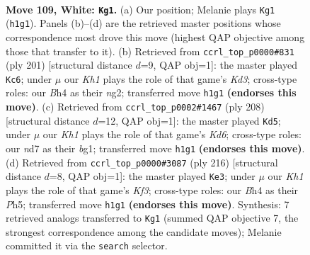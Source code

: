 \documentclass[11pt]{article}
\begin{document}
\clearpage

\begin{figure}[p]\centering
\begin{subfigure}{0.46\textwidth}\centering
\resizebox{\linewidth}{!}{%
\newchessgame
\chessboard[
  setfen={7k/3n4/8/5P2/p6B/P6P/8/7K w - - 37 109},
  showmover=false,
  pgfstyle=straightmove, color=movearrow, markmove={h1-g1}
]}
\caption{}
\end{subfigure}\hfill
\begin{subfigure}{0.46\textwidth}\centering
\resizebox{\linewidth}{!}{%
\newchessgame
\chessboard[
  setfen={8/8/3k4/p7/P2K4/8/4p1N1/8 b - - 69 101},
  showmover=false,
  pgfstyle=straightmove, color=movearrow, markmove={d6-c6}
]}
\caption{}
\end{subfigure}
\\[4pt]
\begin{subfigure}{0.46\textwidth}\centering
\resizebox{\linewidth}{!}{%
\newchessgame
\chessboard[
  setfen={3B4/8/3K2k1/5p2/8/5P1P/8/6b1 w - - 24 105},
  showmover=false,
  pgfstyle=straightmove, color=movearrow, markmove={d6-d5}
]}
\caption{}
\end{subfigure}\hfill
\begin{subfigure}{0.46\textwidth}\centering
\resizebox{\linewidth}{!}{%
\newchessgame
\chessboard[
  setfen={8/6k1/3p4/p6P/2P4P/5K2/8/8 w - - 0 109},
  showmover=false,
  pgfstyle=straightmove, color=movearrow, markmove={f3-e3}
]}
\caption{}
\end{subfigure}
\caption{\textbf{Move 109, White: \texttt{Kg1}.} (a) Our position; Melanie plays \texttt{Kg1} (\texttt{h1g1}). Panels (b)--(d) are the retrieved master positions whose correspondence most drove this move (highest QAP objective among those that transfer to it). (b) Retrieved from \texttt{ccrl\_top\_p0000\#831} (ply 201) [structural distance $d$=9, QAP obj=1]: the master played \texttt{Kc6}; under $\mu$ our \emph{Kh1} plays the role of that game's \emph{Kd3}; cross-type roles: our \emph{B}h4 as their \emph{n}g2; transferred move \texttt{h1g1} \textbf{(endorses this move)}. (c) Retrieved from \texttt{ccrl\_top\_p0002\#1467} (ply 208) [structural distance $d$=12, QAP obj=1]: the master played \texttt{Kd5}; under $\mu$ our \emph{Kh1} plays the role of that game's \emph{Kd6}; cross-type roles: our \emph{n}d7 as their \emph{b}g1; transferred move \texttt{h1g1} \textbf{(endorses this move)}. (d) Retrieved from \texttt{ccrl\_top\_p0000\#3087} (ply 216) [structural distance $d$=8, QAP obj=1]: the master played \texttt{Ke3}; under $\mu$ our \emph{Kh1} plays the role of that game's \emph{Kf3}; cross-type roles: our \emph{B}h4 as their \emph{P}h5; transferred move \texttt{h1g1} \textbf{(endorses this move)}. Synthesis: 7 retrieved analogs transferred to \texttt{Kg1} (summed QAP objective 7, the strongest correspondence among the candidate moves); Melanie committed it via the \texttt{search} selector.}
\label{fig:thought-m216}
\end{figure}
\end{document}

